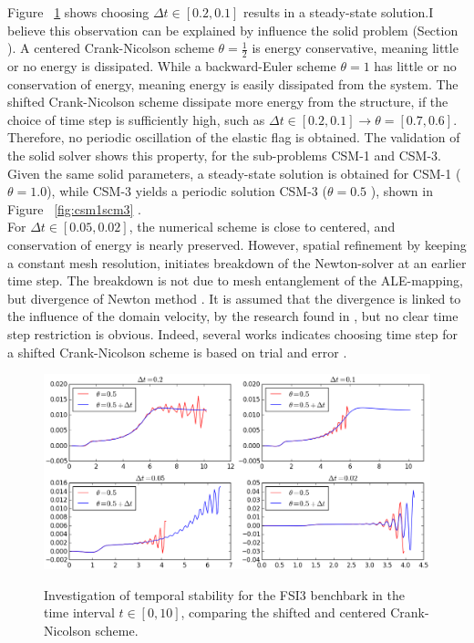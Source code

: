 Figure ~\ref{fig:cncomp1} shows choosing $\Delta t \in [0.2, 0.1]$ results in a steady-state solution.I believe this observation can be explained by influence the solid problem (Section \label{sec:solprob}). A centered Crank-Nicolson scheme $\theta= \frac{1}{2}$ is energy conservative, meaning little or no energy is dissipated. While a backward-Euler scheme $\theta = 1$  has little or no conservation of energy, meaning energy is easily dissipated from the system. The shifted Crank-Nicolson scheme dissipate more energy from the structure, if the choice of time step is sufficiently high, such as $\Delta t \in [0.2, 0.1] \rightarrow \theta = [0.7, 0.6]$.  Therefore, no periodic oscillation of the elastic flag is obtained. The validation of the solid solver shows this property, for the sub-problems CSM-1 and CSM-3. Given the same solid parameters, a steady-state solution is obtained for CSM-1 ($\theta = 1.0 $), while CSM-3 yields a periodic solution CSM-3 ($\theta = 0.5$ ), shown in Figure ~\ref{fig:csm1scm3} .\\

For  $\Delta t \in [0.05, 0.02]$,  the numerical scheme is close to centered, and conservation of energy is nearly preserved. However, spatial refinement by keeping a constant mesh resolution, initiates breakdown of the Newton-solver at an earlier time step. The breakdown is not due to mesh entanglement of the ALE-mapping, but divergence of Newton method \cite{Richter2015}. It is assumed that the divergence is linked to the influence of the domain velocity, by the research found in \cite{Formaggia2004}, but no clear time step restriction is obvious. Indeed, several works indicates choosing time step for a shifted Crank-Nicolson scheme is based on trial and error \cite{Wicka, Wick2013a}. 

\begin{figure}[h!]
 	\centering
    \includegraphics[scale=0.6]{./Fig/thetacheck.png} \\
      \caption{Investigation of temporal stability for the FSI3 benchbark in the time interval $t \in [0, 10]$, comparing the shifted and centered Crank-Nicolson scheme. }
\label{fig:cncomp1}
\end{figure}

